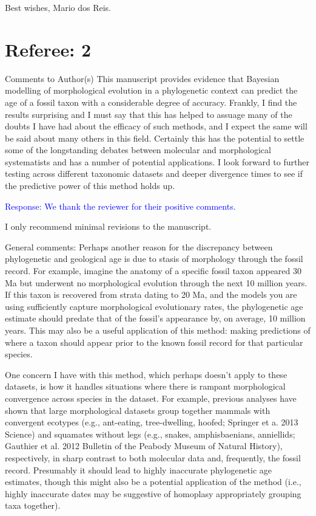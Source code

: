 \documentclass[11pt]{article}
\newcommand{\response}[1]{\medskip{}\textcolor{blue}{{Response: #1}}\medskip{}}
\begin{document}
Best wishes,
Mario dos Reis.

\section*{Referee: 2}

Comments to Author(s)
This manuscript provides evidence that Bayesian modelling of morphological evolution in a phylogenetic context can predict the age of a fossil taxon with a considerable degree of accuracy. Frankly, I find the results surprising and I must say that this has helped to assuage many of the doubts I have had about the efficacy of such methods, and I expect the same will be said about many others in this field. Certainly this has the potential to settle some of the longstanding debates between molecular and morphological systematists and has a number of potential applications. I look forward to further testing across different taxonomic datasets and deeper divergence times to see if the predictive power of this method holds up. 

\response{We thank the reviewer for their positive comments.}

I only recommend minimal revisions to the manuscript.

General comments:
Perhaps another reason for the discrepancy between phylogenetic and geological age is due to stasis of morphology through the fossil record. For example, imagine the anatomy of a specific fossil taxon appeared 30 Ma but underwent no morphological evolution through the next 10 million years. If this taxon is recovered from strata dating to 20 Ma, and the models you are using sufficiently capture morphological evolutionary rates, the phylogenetic age estimate should predate that of the fossil's appearance by, on average, 10 million years. This may also be a useful application of this method: making predictions of where a taxon should appear prior to the known fossil record for that particular species.

One concern I have with this method, which perhaps doesn't apply to these datasets, is how it handles situations where there is rampant morphological convergence across species in the dataset. For example, previous analyses have shown that large morphological datasets group together mammals with convergent ecotypes (e.g., ant-eating, tree-dwelling, hoofed; Springer et a. 2013 Science) and squamates without legs (e.g., snakes, amphisbaenians, anniellids; Gauthier et al. 2012 Bulletin of the Peabody Museum of Natural History), respectively, in sharp contrast to both molecular data and, frequently, the fossil record. Presumably it should lead to highly inaccurate phylogenetic age estimates, though this might also be a potential application of the method (i.e., highly inaccurate dates may be suggestive of homoplasy appropriately grouping taxa together).
\end{document}
